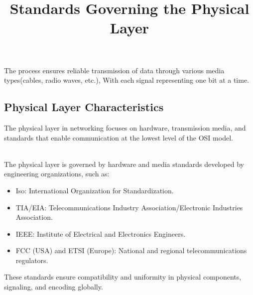 \documentclass[a4paper,11pt]{article}
\begin{document}
The process ensures reliable transmission of data through various media types(cables, radio waves, etc.), With each signal representing one bit at a time.\\

\subsection{Physical Layer Characteristics}
The physical layer in networking focuses on hardware, transmission media, and standards that enable communication at the lowest level of the OSI model.\\

\title{Standards Governing the Physical Layer}\\
The physical layer is governed by hardware and media standards developed by engineering organizations, such as:\\
\begin{itemize}
    \item Iso: International Organization for Standardization.\\
    \item TIA/EIA: Telecommunications Industry Association/Electronic Industries Association.\\
    \item IEEE: Institute of Electrical and Electronics Engineers.\\
    \item FCC (USA) and ETSI (Europe): National and regional telecommunications regulators.\\
\end{itemize}
These standards ensure compatibility and uniformity in physical components, signaling, and encoding globally.\\
\end{document}
